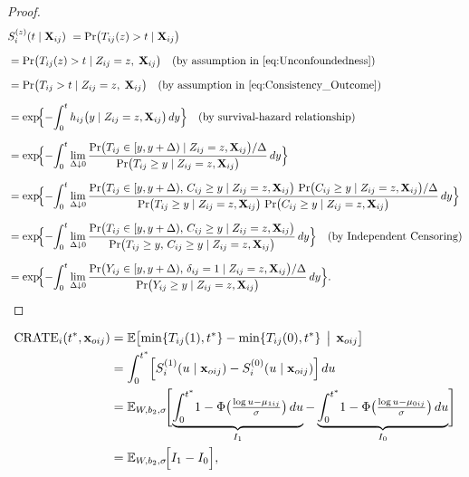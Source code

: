 \documentclass[aoas]{imsart}
\theoremstyle{plain}
\theoremstyle{definition}
\begin{document}
\begin{proof}
\begin{align*}
&S_i^{(z)}(t\mid \mathbf X_{ij}) \ 
= \Pr\bigl(T_{ij}{(z)}>t \mid \mathbf X_{ij}\bigr) \\[6pt]
&= \Pr\bigl(T_{ij}(z)>t \mid Z_{ij}=z,\;\mathbf X_{ij}\bigr)
   \quad (\text{by assumption in \eqref{eq:Unconfoundedness}}) \\[6pt]
&= \Pr\bigl(T_{ij}>t \mid Z_{ij}=z,\;\mathbf X_{ij}\bigr)
   \quad (\text{by assumption in \eqref{eq:Consistency_Outcome}}) \\[6pt]
&= \exp\!\Bigl\{-\!\int_{0}^{t}
     h_{ij}\bigl(y\mid Z_{ij}=z,\mathbf X_{ij}\bigr)\,dy\Bigr\} \quad (\text{by survival-hazard relationship})  \\[6pt]
&= \exp\!\Bigl\{-\!\int_{0}^{t}\lim_{\Delta\downarrow0}
     \frac{\Pr\bigl(T_{ij}\in[y,y+\Delta)\mid Z_{ij}=z,\mathbf X_{ij}\bigr)/\Delta}
          {\Pr\bigl(T_{ij}\ge y\mid Z_{ij}=z,\mathbf X_{ij}\bigr)}
     \,dy\Bigr\} \\[6pt]
&= \exp\!\Bigl\{-\!\int_{0}^{t}\lim_{\Delta\downarrow0}
     \frac{\Pr\bigl(T_{ij}\in[y,y+\Delta),\,C_{ij}\ge y
               \mid Z_{ij}=z,\mathbf X_{ij}\bigr)\,
           \Pr\bigl(C_{ij}\ge y\mid Z_{ij}=z,\mathbf X_{ij}\bigr)/\Delta}
          {\Pr\bigl(T_{ij}\ge y\mid Z_{ij}=z,\mathbf X_{ij}\bigr)\,
           \Pr\bigl(C_{ij}\ge y\mid Z_{ij}=z,\mathbf X_{ij}\bigr)}
     \,dy\Bigr\} \\[6pt]
&= \exp\!\Bigl\{-\!\int_{0}^{t}\lim_{\Delta\downarrow0}
     \frac{\Pr\bigl(T_{ij}\in[y,y+\Delta),\,C_{ij}\ge y
               \mid Z_{ij}=z,\mathbf X_{ij}\bigr)}
          {\Pr\bigl(T_{ij}\ge y,\,C_{ij}\ge y\mid Z_{ij}=z,\mathbf X_{ij}\bigr)}
     \,dy\Bigr\} \quad (\text{by Independent Censoring})  \\[6pt]
&= \exp\!\Bigl\{-\!\int_{0}^{t}\lim_{\Delta\downarrow0}
     \frac{\Pr\bigl(Y_{ij}\in[y,y+\Delta),\,\delta_{ij}=1
               \mid Z_{ij}=z,\mathbf X_{ij}\bigr)/\Delta}
          {\Pr\bigl(Y_{ij}\ge y\mid Z_{ij}=z,\mathbf X_{ij}\bigr)}
     \,dy\Bigr\}.
\end{align*}
\end{proof}
  
\begin{align}
\text{CRATE}_i(t^*,\mathbf{x}_{oij})
&= \mathbb{E}\bigl[\min\{T_{ij}(1),t^*\} - \min\{T_{ij}(0),t^*\}\,\bigm|\,\mathbf{x}_{oij}\bigr] 
\label{eq:CRATEdef}\\
&= \int_{0}^{t^*}\Bigl[S_i^{(1)}(u\mid\mathbf{x}_{oij})
          - S_i^{(0)}(u\mid\mathbf{x}_{oij})\Bigr]\,du
\label{eq:CRATEint}\\
&= \mathbb{E}_{W,b_2,\sigma}\!\Biggl[
   \underbrace{\int_{0}^{t^*}\!1 - \Phi\bigl(\tfrac{\log u - \mu_{1ij}}{\sigma}\bigr)\,du}_{I_1}
 - \underbrace{\int_{0}^{t^*}\!1 - \Phi\bigl(\tfrac{\log u - \mu_{0ij}}{\sigma}\bigr)\,du}_{I_0}
\Biggr]
\label{eq:swap}\\
&= \mathbb{E}_{W,b_2,\sigma}\!\Bigl[I_1 - I_0\Bigr],
\end{align}
\end{document}
